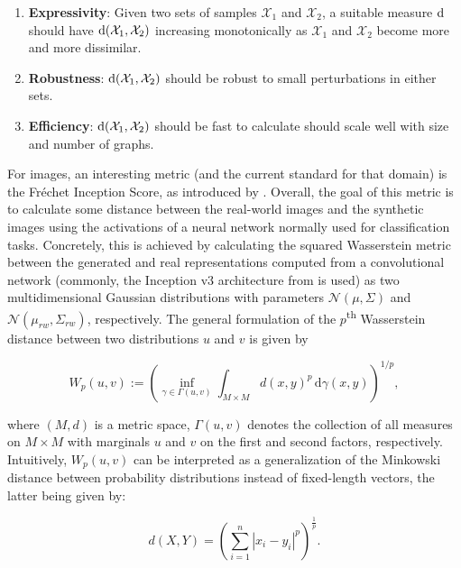 \begin{enumerate}
\item \textbf{Expressivity}: Given two sets of samples $\mathcal{X}_1$ and
$\mathcal{X}_2$, a suitable measure $\text{d}$ should have
$\text{d}(\mathcal{X}_1,\mathcal{X}_2)$ increasing monotonically as
$\mathcal{X}_1$ and $\mathcal{X}_2$ become more and more dissimilar.
\item \textbf{Robustness}: $\text{d}(\mathcal{X}_1,\mathcal{X}_2)$ should be
robust to small perturbations in either sets.
\item \textbf{Efficiency}: $\text{d}(\mathcal{X}_1,\mathcal{X}_2)$ should be
fast to calculate should scale well with size and number of graphs.
\end{enumerate}


For images, an interesting metric (and the current standard for that domain) is
the Fr\'echet Inception Score, as introduced by \cite{heusel2017gans}. Overall,
the goal of this metric is to calculate some distance between the real-world
images and the synthetic images using the activations of a neural network
normally used for classification tasks. Concretely, this is achieved by
calculating the squared Wasserstein metric between the generated and real
representations computed from a convolutional network (commonly, the Inception v3
architecture from \cite{szegedy2016rethinking} is used) as two multidimensional
Gaussian distributions with parameters $\mathcal{N}(\mu, \Sigma)$ and
$\mathcal{N}(\mu_{rw}, \Sigma_{rw})$, respectively. The general formulation of
the $p$\textsuperscript{th} Wasserstein distance between two distributions $u$
and $v$ is given by

\begin{equation}
  \label{eq:wasserstein_distance} W_p(u,v) := \left(\inf _{\gamma \in \Gamma
(u,v)}\int _{M\times M}d(x,y)^{p}\,\mathrm {d} \gamma (x,y)\right)^{1/p},
\end{equation}

where $(M, d)$ is a metric space, $\Gamma (u,v)$ denotes the collection of all
measures on $M\times M$ with marginals $u$ and $v$ on the first and second
factors, respectively. Intuitively, $W_p(u,v)$ can be interpreted as a
generalization of the Minkowski distance between probability distributions
instead of fixed-length vectors, the latter being given by:

\begin{equation}
  \label{eq:minkoski}
  d\left(X,Y\right)=\left(\sum _{i=1}^{n}|x_{i}-y_{i}|^{p}\right)^{\frac {1}{p}}.
\end{equation}


